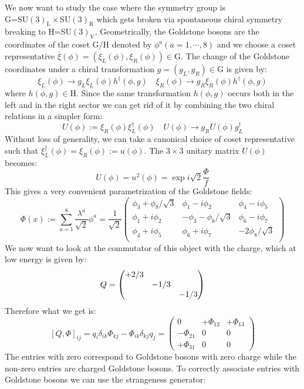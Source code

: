 \documentclass[../main.tex]{subfiles}
\begin{document}
We now want to study the case where the symmetry group is\\
G=SU$(3)_{\text{L}}\times$SU$(3)_{\text{R}}$ which gets broken via spontaneous chiral symmetry breaking to H=SU$(3)_{\text{V}}$. Geometrically, the Goldstone bosons are the coordinates of the coset G/H denoted by $\phi^a(a=1,\cdots,8)$ 
and we choose a coset representative $\overline{\xi}(\phi)=(\xi_L(\phi),\xi_R(\phi))\in\text{G}$. The change of the Goldstone coordinates under a chiral transformation $g=(g_L,g_R)\in\text{G}$ is given by:
\[
\xi_L(\phi)\to g_L\xi_L(\phi)h^\dagger(\phi,g) \quad \xi_R(\phi)\to g_R\xi_R(\phi)h^\dagger(\phi,g)
\]
where $h(\phi,g)\in\text{H}$. Since the same transformation $h(\phi,g)$ occurs both in the left and in the right sector we can get rid of it by combining the two chiral relations in a simpler form:
\[
U(\phi):=\xi_R(\phi)\xi_L^\dagger(\phi) \quad U(\phi)\to g_RU(\phi)g_L^\dagger
\]
Without loss of generality, we can take a canonical choice of coset representative such that $\xi_L^\dagger(\phi)=\xi_R(\phi):=u(\phi)$. The $3\times3$ unitary matrix $U(\phi)$ becomes:
\[
U(\phi)=u^2(\phi)=\exp{i\sqrt{2}\frac{\Phi}{f}}
\]
This gives a very convenient parametrization of the Goldstone fields:
\[
\Phi(x):=\sum_{a=1}^8\frac{\lambda^a}{\sqrt{2}}\phi^a=\frac{1}{\sqrt{2}}\left(\begin{array}{ccc}
    \phi_3+\phi_8/\sqrt{3} & \phi_1-i\phi_2 & \phi_4-i\phi_5 \\
    \phi_1+i\phi_2 & -\phi_3-\phi_8/\sqrt{3} & \phi_6-i\phi_7 \\
    \phi_4+i\phi_5 & \phi_6+i\phi_7 & -2\phi_8/\sqrt{3} \\
\end{array}\right)
\]
We now want to look at the commutator of this object with the charge, which at low energy is given by:
\[
Q=\mqty(\dmat{+2/3,-1/3,-1/3})
\]
Therefore what we get is:
\[
[Q,\Phi]_{ij}=q_i\delta_{ik}\Phi_{kj}-\Phi_{ik}\delta_{kj}q_j=\left(\begin{array}{ccc}
    0 & +\Phi_{12} & +\Phi_{13} \\
    -\Phi_{21} & 0 & 0 \\
    +\Phi_{31} & 0 & 0
\end{array}\right)
\]
The entries with zero correspond to Goldstone bosons with zero charge while the non-zero entries are charged Goldstone bosons. To correctly associate entries with Goldstone bosons we can use the strangeness generator:
\end{document}
